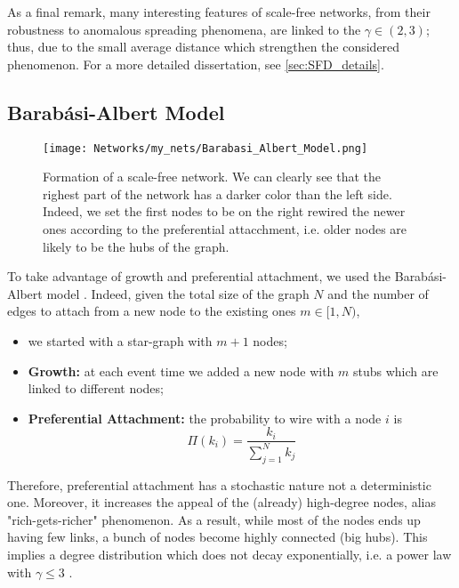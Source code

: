 \documentclass[a4paper,10pt, oneside]{book} %
\theoremstyle{definition}
\begin{document}
As a final remark, many interesting features of scale-free networks, from their robustness to anomalous spreading phenomena, are linked to the $\gamma \in (2,3)$; thus, due to the small average distance which strengthen the considered phenomenon.
For a more detailed dissertation, see \autoref{sec:SFD_details}.

\newpage
\subsection{Barabási-Albert Model}
\begin{figure}[ht]
	\texttt{[image: Networks/my\_nets/Barabasi\_Albert\_Model.png]}
	\centering
	\caption{Formation of a scale-free network. We can clearly see that the righest part of the network has a darker color than the left side. Indeed, we set the first nodes to be on the right rewired the newer ones according to the preferential attacchment, i.e. older nodes are likely to be the hubs of the graph.}
	\label{fig:LCD_growth}
\end{figure}

\label{sec:BA_model}
To take advantage of growth and preferential attachment, we used the Barabási-Albert model \cite{barabasi::2016networkbook}. Indeed, given the total size of the graph $ N$ and the number of edges to attach from a new node to the existing ones $ m \in [1,N)$, 
\begin{itemize}
	\item we started with a star-graph with $m+1$ nodes;
	\item \textbf{Growth:} at each event time we added a new node with $m$ stubs which are linked to different nodes;
	\item \textbf{Preferential Attachment:} the probability to wire with a node $i$ is
	\begin{equation}
		\Pi(k_i) = \frac{k_i}{\sum_{j = 1}^N k_j}
	\end{equation}
\end{itemize}

Therefore, preferential attachment has a stochastic nature not a deterministic one. Moreover, it increases the appeal of the (already) high-degree nodes, alias \label{cit:SaraSagone1} "rich-gets-richer" phenomenon. As a result, while most of the nodes ends up having few links, a bunch of nodes become highly connected (big hubs). This implies a degree distribution which does not decay exponentially, i.e. a power law with $\gamma \leq 3$ \cite{barabasi::2016networkbook}. 
\end{document}
